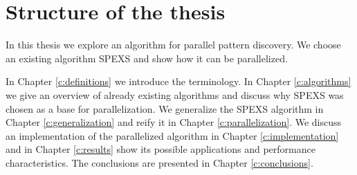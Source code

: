 \section{Structure of the thesis}

In this thesis we explore an algorithm for parallel pattern discovery. We choose an existing algorithm SPEXS\cite{spexs} and show how it can be parallelized.

In Chapter \ref{c:definitions} we introduce the terminology. In Chapter \ref{c:algorithms} we give an overview of already existing algorithms and discuss why SPEXS\cite{spexs} was chosen as a base for parallelization. We generalize the SPEXS algorithm in Chapter \ref{c:generalization} and reify it in Chapter \ref{c:parallelization}. We discuss an implementation of the parallelized algorithm in Chapter \ref{c:implementation} and in Chapter \ref{c:results} show its possible applications and performance characteristics. The conclusions are presented in Chapter \ref{c:conclusions}.
